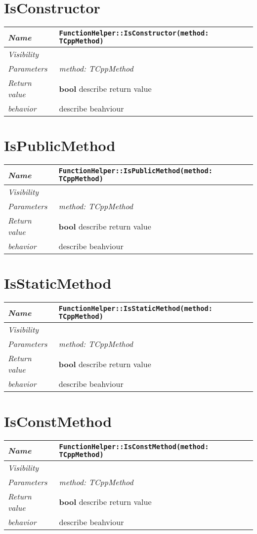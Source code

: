  \section{IsConstructor}
\begin{longtable}{p{3cm} @{\hskip 1cm} p{12cm}}
 \hline
\textit{Name} & \texttt{FunctionHelper::IsConstructor(method: TCppMethod)}\\
\hline
 \textit{Visibility} & \\
\hline
\textit{Parameters} & \textit{method: TCppMethod}\\
\hline
\textit{Return value} & \textbf{ bool} describe return value\\
  \hline
 \textit{behavior} & describe beahviour \\
\hline
\end{longtable} \pagebreak
 \section{IsPublicMethod}
\begin{longtable}{p{3cm} @{\hskip 1cm} p{12cm}}
 \hline
\textit{Name} & \texttt{FunctionHelper::IsPublicMethod(method: TCppMethod)}\\
\hline
 \textit{Visibility} & \\
\hline
\textit{Parameters} & \textit{method: TCppMethod}\\
\hline
\textit{Return value} & \textbf{ bool} describe return value\\
  \hline
 \textit{behavior} & describe beahviour \\
\hline
\end{longtable} \pagebreak
 \section{IsStaticMethod}
\begin{longtable}{p{3cm} @{\hskip 1cm} p{12cm}}
 \hline
\textit{Name} & \texttt{FunctionHelper::IsStaticMethod(method: TCppMethod)}\\
\hline
 \textit{Visibility} & \\
\hline
\textit{Parameters} & \textit{method: TCppMethod}\\
\hline
\textit{Return value} & \textbf{ bool} describe return value\\
  \hline
 \textit{behavior} & describe beahviour \\
\hline
\end{longtable} \pagebreak
 \section{IsConstMethod}
\begin{longtable}{p{3cm} @{\hskip 1cm} p{12cm}}
 \hline
\textit{Name} & \texttt{FunctionHelper::IsConstMethod(method: TCppMethod)}\\
\hline
 \textit{Visibility} & \\
\hline
\textit{Parameters} & \textit{method: TCppMethod}\\
\hline
\textit{Return value} & \textbf{ bool} describe return value\\
  \hline
 \textit{behavior} & describe beahviour \\
\hline
\end{longtable} \pagebreak
